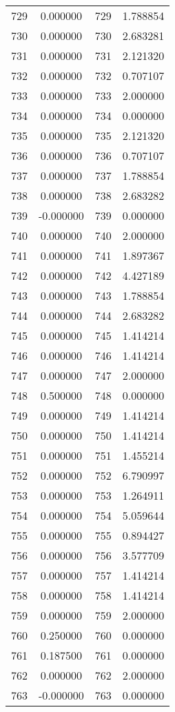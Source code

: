 \documentclass[12pt]{article}
\begin{document}
\begin{longtable}{@{}cccc@{}}
729 & 0.000000 & 729 & 1.788854 \\
730 & 0.000000 & 730 & 2.683281 \\
731 & 0.000000 & 731 & 2.121320 \\
732 & 0.000000 & 732 & 0.707107 \\
733 & 0.000000 & 733 & 2.000000 \\
734 & 0.000000 & 734 & 0.000000 \\
735 & 0.000000 & 735 & 2.121320 \\
736 & 0.000000 & 736 & 0.707107 \\
737 & 0.000000 & 737 & 1.788854 \\
738 & 0.000000 & 738 & 2.683282 \\
739 & -0.000000 & 739 & 0.000000 \\
740 & 0.000000 & 740 & 2.000000 \\
741 & 0.000000 & 741 & 1.897367 \\
742 & 0.000000 & 742 & 4.427189 \\
743 & 0.000000 & 743 & 1.788854 \\
744 & 0.000000 & 744 & 2.683282 \\
745 & 0.000000 & 745 & 1.414214 \\
746 & 0.000000 & 746 & 1.414214 \\
747 & 0.000000 & 747 & 2.000000 \\
748 & 0.500000 & 748 & 0.000000 \\
749 & 0.000000 & 749 & 1.414214 \\
750 & 0.000000 & 750 & 1.414214 \\
751 & 0.000000 & 751 & 1.455214 \\
752 & 0.000000 & 752 & 6.790997 \\
753 & 0.000000 & 753 & 1.264911 \\
754 & 0.000000 & 754 & 5.059644 \\
755 & 0.000000 & 755 & 0.894427 \\
756 & 0.000000 & 756 & 3.577709 \\
757 & 0.000000 & 757 & 1.414214 \\
758 & 0.000000 & 758 & 1.414214 \\
759 & 0.000000 & 759 & 2.000000 \\
760 & 0.250000 & 760 & 0.000000 \\
761 & 0.187500 & 761 & 0.000000 \\
762 & 0.000000 & 762 & 2.000000 \\
763 & -0.000000 & 763 & 0.000000 \\

\end{longtable}
\end{document}
